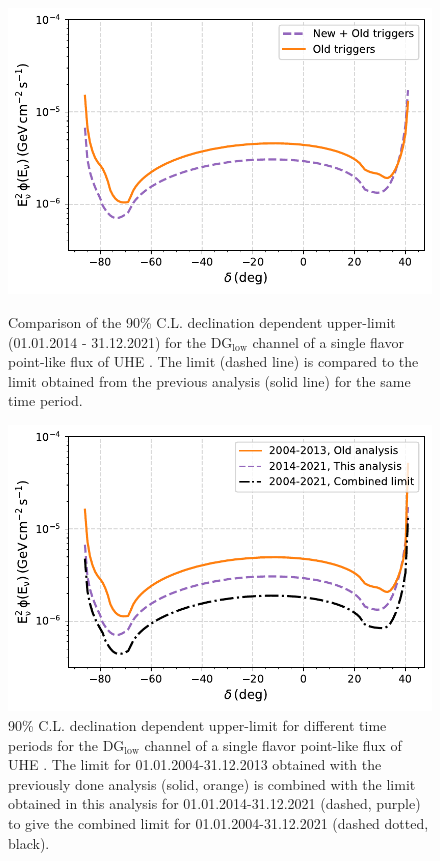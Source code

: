 \begin{figure}[th!]
  \centering
  \includegraphics[width=\textwidth]{thesis_figures/PointLimits/Point_comp_new_old.pdf}
  \caption{Comparison of the 90\% C.L. declination dependent upper-limit (01.01.2014 - 31.12.2021) for the DG$_{\text{low}}$ channel of a single flavor point-like flux of UHE . The limit (dashed line) is compared to the limit obtained from the previous analysis (solid line) for the same time period.}
  \label{fig:Dec_limit_new old}
  \includegraphics[width=14.5cm]{thesis_figures/PointLimits/Point_comp_combined.pdf}
  \caption{90\% C.L. declination dependent upper-limit for different time periods for the DG$_{\text{low}}$ channel of a single flavor point-like flux of UHE . The limit for 01.01.2004-31.12.2013 obtained with the previously done analysis (solid, orange) is combined with the limit obtained in this analysis for 01.01.2014-31.12.2021 (dashed, purple) to give the combined limit for 01.01.2004-31.12.2021 (dashed dotted, black).}
  \label{fig:Dec_limit_comb1}
\end{figure}

